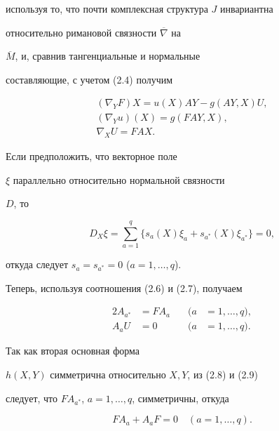 используя то, что почти комплексная структура $J$ инвариантна


относительно римановой связности $\overline\nabla$ на


$\overline M$, и, сравнив тангенциальные и нормальные


составляющие, с учетом (2.4) получим


\begin{gather*}


(\nabla_YF)X=u(X)AY-g(AY,X)U, \\


(\nabla_Yu)(X)=g(FAY,X), \\


\nabla_XU=FAX.


\end{gather*}





Если предположить, что векторное поле


$\xi$ параллельно относительно нормальной связности


$D$, то 


$$


D_X\xi=\sum_{a=1}^q\{s_a(X)\xi_a+s_{a^*}(X)\xi_{a^*}\}=0,


$$


откуда следует $s_a=s_{a^*}=0$ ($a=1,\dotsc,q$).


Теперь, используя соотношения (2.6) и (2.7), получаем


\begin{alignat}{2}


A_{a^*}&=FA_a  &\quad (a&=1,\dotsc,q), \\


A_aU&=0  &\quad (a&=1,\dotsc,q).


\end{alignat}





Так как вторая основная форма


$h(X,Y)$ симметрична относительно $X,Y$, из (2.8) и (2.9)


следует, что $FA_{a^*}$, $a=1,\dotsc,q$, симметричны, откуда


\begin{equation}


FA_a+A_aF=0 \quad (a=1,\dotsc,q).


\end{equation}





